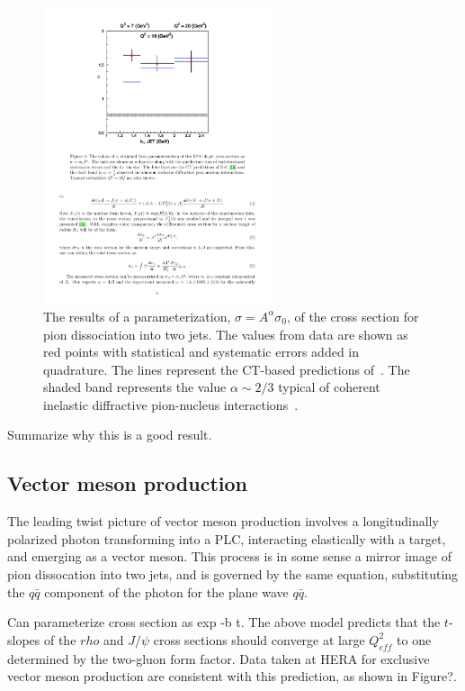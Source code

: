 \begin{figure}[!h]
    \centering
    \includegraphics[width=0.6\textwidth]{chap2/pion_dijet_alpha.pdf}
    \caption{The results of a parameterization, $\sigma=A^\alpha\sigma_0$, of
             the cross section for pion dissociation into two jets.
             The values from data are shown as red points with statistical and
             systematic errors added in quadrature.
             The lines represent the CT-based predictions
             of~\cite{Frankfurt_1993}.
             The shaded band represents the value $\alpha\sim2/3$ typical of
             coherent inelastic diffractive pion-nucleus
             interactions~\cite{Zielinsk_1983}.
            }
    \label{fig:pion_dijet_alpha}
\end{figure}


Summarize why this is a good result.

\subsection{Vector meson production}
The leading twist picture of vector meson production involves a longitudinally
polarized photon transforming into a PLC, interacting elastically with a
target, and emerging as a vector meson.
This process is in some sense a mirror image of pion dissocation into two jets,
and is governed by the same equation, substituting the $q\bar{q}$ component of
the photon for the plane wave $q\bar{q}$.


Can parameterize cross section as exp -b t.
The above model predicts that the $t$-slopes of the $rho$ and $J/\psi$ cross
sections should converge at large $Q^2_{eff}$ to one determined by the
two-gluon form factor.
Data taken at HERA for exclusive vector meson production are consistent
with this prediction, as shown in Figure?.
